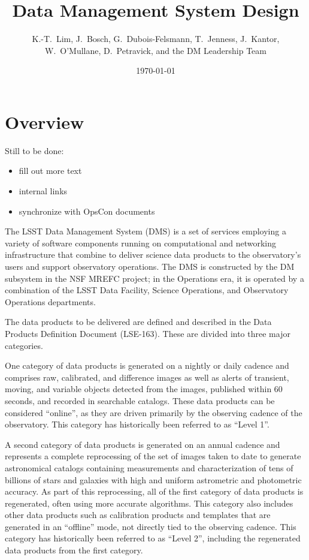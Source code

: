 \documentclass[DM,lsstdraft,toc]{lsstdoc}
\title{Data Management System Design}
\author{
  K.-T.~Lim,
  J.~Bosch,
  G.~Dubois-Felsmann,
  T.~Jenness,
  J.~Kantor,
  W.~O'Mullane,
  D.~Petravick,
  and
  the DM Leadership Team}
\date{\today}
\begin{document}
\maketitle

\section{Overview}\label{overview}

Still to be done:
\begin{itemize}
\item
  fill out more text
\item
  internal links
\item
  synchronize with OpsCon documents
\end{itemize}

The LSST Data Management System (DMS) is a set of services employing a
variety of software components running on computational and networking
infrastructure that combine to deliver science data products to the
observatory's users and support observatory operations. The DMS is
constructed by the DM subsystem in the NSF MREFC project; in the
Operations era, it is operated by a combination of the LSST Data
Facility, Science Operations, and Observatory Operations departments.

The data products to be delivered are defined and described in the Data
Products Definition Document (LSE-163). These are divided into three
major categories.

One category of data products is generated on a nightly or daily cadence
and comprises raw, calibrated, and difference images as well as alerts
of transient, moving, and variable objects detected from the images,
published within 60 seconds, and recorded in searchable catalogs. These
data products can be considered ``online'', as they are driven primarily
by the observing cadence of the observatory. This category has
historically been referred to as ``Level 1''.

A second category of data products is generated on an annual cadence and
represents a complete reprocessing of the set of images taken to date to
generate astronomical catalogs containing measurements and
characterization of tens of billions of stars and galaxies with high and
uniform astrometric and photometric accuracy. As part of this
reprocessing, all of the first category of data products is regenerated,
often using more accurate algorithms. This category also includes other
data products such as calibration products and templates that are
generated in an ``offline'' mode, not directly tied to the observing
cadence. This category has historically been referred to as ``Level 2'',
including the regenerated data products from the first category.
\end{document}
